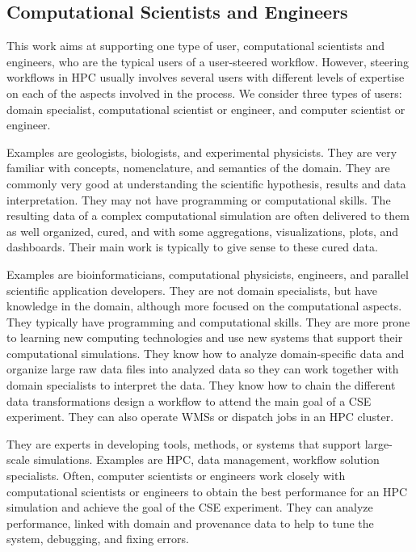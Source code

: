 \subsection{Computational Scientists and Engineers}
\label{cse_users}

This work aims at supporting one type of user, \ie{}
computational scientists and engineers,
who are the typical users of a user-steered
workflow. However, steering workflows in HPC usually
involves several users with different levels of expertise on each
of the aspects involved in the process. We consider three types of
users: domain specialist, computational scientist or engineer, and computer
scientist or engineer.


Examples are geologists, biologists, and
experimental physicists. They are very familiar with concepts,
nomenclature, and semantics of the domain. They are commonly very good
at understanding the scientific hypothesis, results and data
interpretation. They may not have programming or computational skills.
The resulting data of a complex computational simulation are often
delivered to them as well organized, cured, and with some aggregations,
visualizations, plots, and dashboards. Their main work is typically to
give sense to these cured data.


Examples are bioinformaticians,
computational physicists, engineers, and parallel scientific application
developers. They are not domain specialists, but have knowledge in the
domain, although more focused on the computational aspects.
They typically have programming and computational skills.
They are more prone to learning
new computing technologies and use new systems that support their
computational simulations.
They know how to analyze domain-specific data and organize large raw data files into analyzed data so
they can work together with domain specialists to interpret the
data.
They know how to chain the different data transformations
design a workflow to attend the main goal of a CSE experiment.
They can also operate WMSs or dispatch jobs in an HPC cluster.


They are experts in developing tools,
methods, or systems that support large-scale simulations. Examples are
HPC, data management, workflow solution specialists.
Often, computer scientists or engineers work
closely with computational scientists or engineers to obtain the best performance for
an HPC simulation and achieve the goal of the CSE experiment.
They can analyze
performance, linked with domain and provenance data to help to tune
the system, debugging, and fixing errors.



